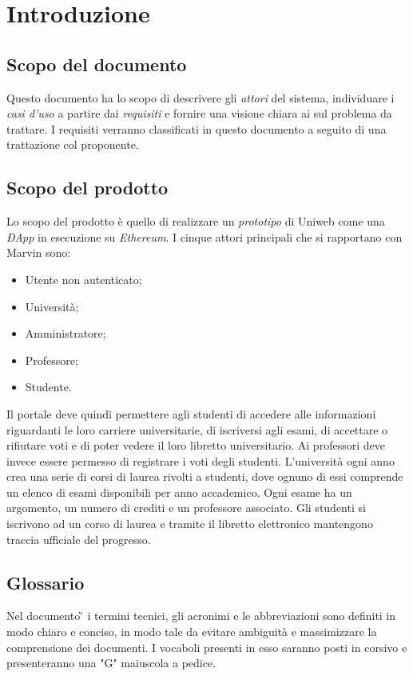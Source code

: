 \section{Introduzione}
\subsection{Scopo del documento}
Questo documento ha lo scopo di descrivere gli \emph{attori} del sistema, individuare i \emph{casi d'uso} a partire dai \emph{requisiti} e fornire una visione chiara ai \progs{} sul problema da trattare. I requisiti verranno classificati in questo documento a seguito di una trattazione col proponente.

\subsection{Scopo del prodotto}
Lo scopo del prodotto è quello di realizzare un \emph{prototipo} di Uniweb come una \emph{ÐApp} in esecuzione su \emph{Ethereum}. I cinque attori principali che si rapportano con Marvin sono:
\begin{itemize}
	\item Utente non autenticato; 
	\item Università;
	\item Amministratore;
	\item Professore;
	\item Studente.
\end{itemize} 
Il portale deve quindi permettere agli studenti di accedere alle informazioni riguardanti le loro carriere universitarie, di iscriversi agli esami, di accettare o rifiutare voti e di poter vedere il loro libretto universitario.
Ai professori deve invece essere permesso di registrare i voti degli studenti.
L'università ogni anno crea una serie di corsi di laurea rivolti a studenti, dove ognuno di essi comprende un elenco di esami disponibili per anno accademico. Ogni esame ha un argomento, un numero di crediti e un professore associato. Gli studenti si iscrivono ad un corso di laurea e tramite il libretto elettronico mantengono traccia ufficiale del progresso.

\subsection{Glossario}
Nel documento \G{} i termini tecnici, gli acronimi e le abbreviazioni sono definiti in modo chiaro e conciso, in modo tale da evitare ambiguità e massimizzare la comprensione dei documenti.
\newline I vocaboli presenti in esso saranno posti in corsivo e presenteranno una "G" maiuscola a pedice.

